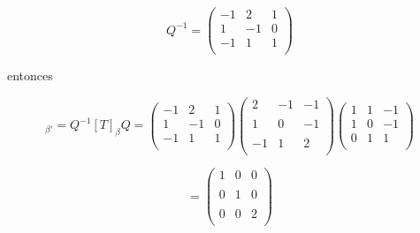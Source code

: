 \documentclass[12pt,a4paper]{article}
\begin{document}
\begin{enumerate}
    \begin{equation*}
        Q^{-1} = \left(\begin{array}{rcc}
            -1 & 2 & 1 \\
            1&-1 & 0 \\
            -1 & 1 & 1 \\
        \end{array}\right)
    \end{equation*}
    
    entonces
    
    \begin{equation*}
        [T]_{\beta'} = Q^{-1}[T]_\beta Q =\left(\begin{array}{rcc}
            -1 & 2 & 1 \\
            1&-1 & 0 \\
            -1 & 1 & 1 \\
        \end{array}\right)\left( \begin{array}{lcc}
            2 & -1 & -1 \\
            \\ 1 & 0 & -1 \\
            \\ -1 & 1 & 2 \\
        \end{array}
        \right)\left(\begin{array}{lcc}
            1 & 1 & -1 \\
            1 & 0 & -1 \\
            0 & 1 & 1 \\
        \end{array}\right) 
    \end{equation*} 
    
    \begin{equation*}
        =\left( \begin{array}{lcc}
            1 & 0 & 0 \\
            \\ 0 & 1 & 0 \\
            \\ 0 & 0 & 2 \\
        \end{array}
        \right)
    \end{equation*}
\end{enumerate}
\end{document}
